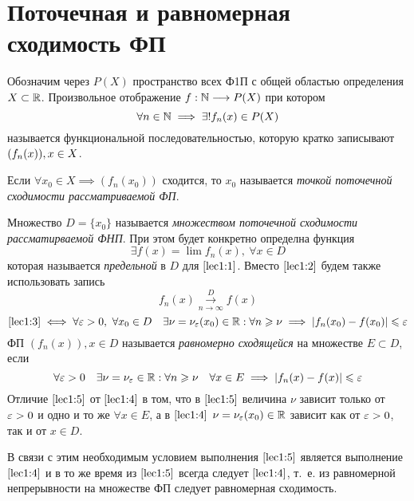 \documentclass[../../main.tex]{subfiles}
\begin{document}
\section{Поточечная и равномерная сходимость ФП}
Обозначим через $P(X)$ пространство всех Ф1П 
с общей областью определения $X \subset \mathbb{R}$.
Произвольное отображение $f: \mathbb{N} \longrightarrow P(X)$ при котором 
\begin{equation}
\label{lec1:1}
\forall n \in \mathbb{N} \implies \exists! f_n(x) \in P(X)
\end{equation}
называется функциональной последовательностью, 
которую кратко записывают $(f_n(x)),\\ x\in X$.

Если $\forall x_0 \in X \implies (f_n(x_0))$ сходится, то $x_0$ называется
\emph{точкой поточечной сходимости рассматриваемой ФП}.

Множество $D = \{x_0\}$ называется \emph{множеством поточечной сходимости
рассматирваемой ФНП}.
При этом будет конкретно определна функция 
\begin{equation}
\label{lec1:2}
\exists f(x) = \lim f_n(x),\ \forall x \in D
\end{equation}
которая называется \emph{предельной} в $D$ для $\eqref{lec1:1}$.
Вместо $\eqref{lec1:2}$ будем также использовать запись 
\begin{equation}
\label{lec1:3}
f_n(x) \overset{D}{\underset{n \to \infty}\longrightarrow} f(x)
\end{equation}
\begin{equation}
\label{lec1:4}
\eqref{lec1:3} \iff \forall \varepsilon > 0,\ \forall x_0 \in D \quad 
\exists \nu = \nu_\varepsilon(x_0) \in \mathbb{R} : \forall n \geqslant \nu \implies
|f_n(x_0) - f(x_0)| \leqslant \varepsilon
\end{equation}
ФП $(f_n(x)), x \in D$ называется \emph{равномерно сходящейся} 
на множестве $E \subset D$, если 
\begin{equation}
\label{lec1:5}
\forall \varepsilon > 0 \quad
\exists \nu = \nu_\varepsilon \in \mathbb{R} : 
\forall n \geqslant \nu \quad
\forall x \in E \implies 
|f_n(x) - f(x)| \leqslant \varepsilon
\end{equation}
Отличие $\eqref{lec1:5}$ от $\eqref{lec1:4}$ в том, что  в $\eqref{lec1:5}$
величина $\nu$ зависит только от $\varepsilon > 0$ и одно и то же $\forall x \in E$,
а в $\eqref{lec1:4}$ $\nu = \nu_\varepsilon(x_0) \in \mathbb{R}$ зависит как от $\varepsilon > 0$,
так и от $x \in D$.

В связи с этим необходимым условием выполнения $\eqref{lec1:5}$ 
является выполнение $\eqref{lec1:4}$ и в то же время из $\eqref{lec1:5}$
всегда следует $\eqref{lec1:4}$, т.~е. из равномерной непрерывности на 
множестве ФП следует равномерная сходимость.
\end{document}
